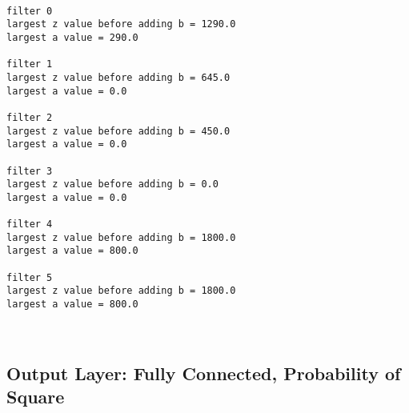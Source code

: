\documentclass[11pt]{article}
\begin{document}
    \begin{Verbatim}[commandchars=\\\{\}]

filter 0
largest z value before adding b = 1290.0
largest a value = 290.0

filter 1
largest z value before adding b = 645.0
largest a value = 0.0

filter 2
largest z value before adding b = 450.0
largest a value = 0.0

filter 3
largest z value before adding b = 0.0
largest a value = 0.0

filter 4
largest z value before adding b = 1800.0
largest a value = 800.0

filter 5
largest z value before adding b = 1800.0
largest a value = 800.0
    \end{Verbatim}

    \begin{center}
    \end{center}
    { \hspace*{\fill} \\}
    
    \hypertarget{output-layer-fully-connected-probability-of-square}{%
\subsection{Output Layer: Fully Connected, Probability of
Square}\label{output-layer-fully-connected-probability-of-square}}
\end{document}
